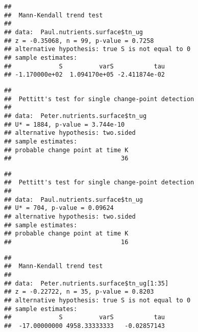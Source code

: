 \documentclass[]{article}
\newenvironment{Shaded}{\begin{snugshade}}{\end{snugshade}}
\newcommand{\KeywordTok}[1]{\textcolor[rgb]{0.13,0.29,0.53}{\textbf{#1}}}
\newcommand{\DecValTok}[1]{\textcolor[rgb]{0.00,0.00,0.81}{#1}}
\newcommand{\OperatorTok}[1]{\textcolor[rgb]{0.81,0.36,0.00}{\textbf{#1}}}
\newcommand{\NormalTok}[1]{#1}
\begin{document}
\begin{verbatim}
## 
##  Mann-Kendall trend test
## 
## data:  Paul.nutrients.surface$tn_ug
## z = -0.35068, n = 99, p-value = 0.7258
## alternative hypothesis: true S is not equal to 0
## sample estimates:
##             S          varS           tau 
## -1.170000e+02  1.094170e+05 -2.411874e-02
\end{verbatim}

\begin{Shaded}
\end{Shaded}

\begin{verbatim}
## 
##  Pettitt's test for single change-point detection
## 
## data:  Peter.nutrients.surface$tn_ug
## U* = 1884, p-value = 3.744e-10
## alternative hypothesis: two.sided
## sample estimates:
## probable change point at time K 
##                              36
\end{verbatim}

\begin{Shaded}
\end{Shaded}

\begin{verbatim}
## 
##  Pettitt's test for single change-point detection
## 
## data:  Paul.nutrients.surface$tn_ug
## U* = 704, p-value = 0.09624
## alternative hypothesis: two.sided
## sample estimates:
## probable change point at time K 
##                              16
\end{verbatim}

\begin{Shaded}
\end{Shaded}

\begin{verbatim}
## 
##  Mann-Kendall trend test
## 
## data:  Peter.nutrients.surface$tn_ug[1:35]
## z = -0.22722, n = 35, p-value = 0.8203
## alternative hypothesis: true S is not equal to 0
## sample estimates:
##             S          varS           tau 
##  -17.00000000 4958.33333333   -0.02857143
\end{verbatim}
\end{document}

